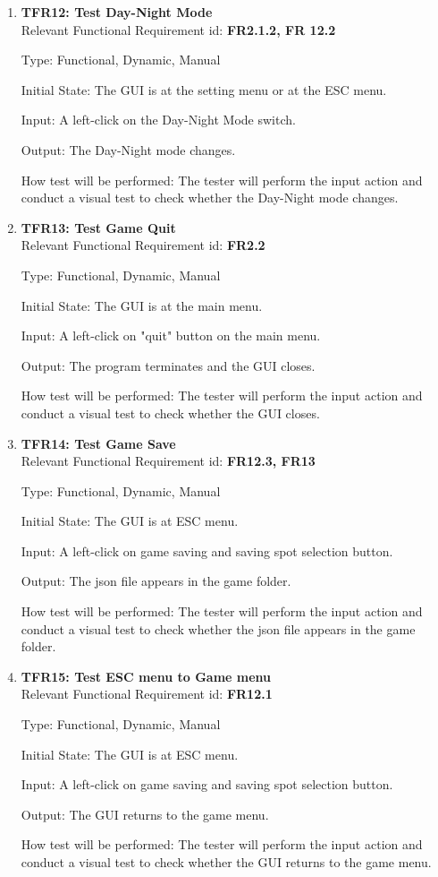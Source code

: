 \documentclass[12pt, titlepage]{article}
\begin{document}
\begin{enumerate}
\item{\textbf{TFR12: Test Day-Night Mode}\\}
Relevant Functional Requirement id: \textbf{FR2.1.2, FR 12.2}

Type: Functional, Dynamic, Manual

Initial State: The GUI is at the setting menu or at the ESC menu.

Input: A left-click on the Day-Night Mode switch.

Output: The Day-Night mode changes.

How test will be performed: The tester will perform the input action and conduct a visual test to check whether the Day-Night mode changes.

\item{\textbf{TFR13: Test Game Quit}\\}
Relevant Functional Requirement id: \textbf{FR2.2}

Type: Functional, Dynamic, Manual

Initial State: The GUI is at the main menu.

Input: A left-click on "quit" button on the main menu.

Output: The program terminates and the GUI closes.

How test will be performed: The tester will perform the input action and conduct a visual test to check whether the GUI closes.

\item{\textbf{TFR14: Test Game Save}\\}
\label{save}
Relevant Functional Requirement id: \textbf{FR12.3, FR13}

Type: Functional, Dynamic, Manual

Initial State: The GUI is at ESC menu.

Input: A left-click on game saving and saving spot selection button.

Output: The json file appears in the game folder.

How test will be performed: The tester will perform the input action and conduct a visual test to check whether the json file appears in the game folder.

\item{\textbf{TFR15: Test ESC menu to Game menu}\\}
Relevant Functional Requirement id: \textbf{FR12.1}

Type: Functional, Dynamic, Manual

Initial State: The GUI is at ESC menu.

Input: A left-click on game saving and saving spot selection button.

Output: The GUI returns to the game menu.

How test will be performed: The tester will perform the input action and conduct a visual test to check whether the GUI returns to the game menu.

\end{enumerate}
\end{document}
